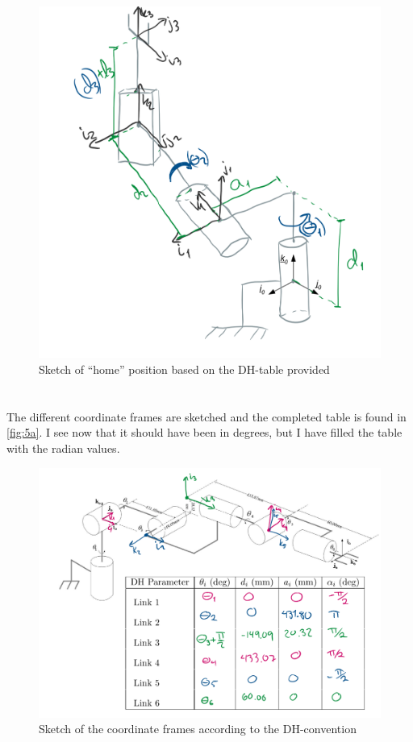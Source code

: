 \documentclass[a4paper]{scrartcl}
\begin{document}
\begin{figure}[hb!]
    \centering
    \includegraphics[width = .95\textwidth]{4_newest.PNG}
    \caption{Sketch of ``home'' position based on the DH-table provided}
    \label{fig:4}
\end{figure}

\section{}
\subsection{}
The different coordinate frames are sketched and the completed table is found in \autoref{fig:5a}. I see now that it should have been in degrees, but I have filled the table with the radian values.   
\begin{figure}[hb!]
    \centering
    \includegraphics[width = .95\textwidth]{5a.PNG}
    \caption{Sketch of the coordinate frames according to the DH-convention}
    \label{fig:5a}
\end{figure}
\end{document}
